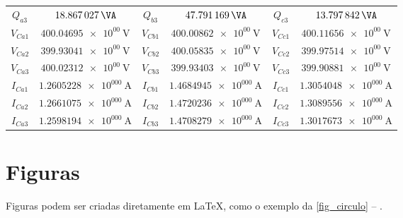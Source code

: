\begin{table}[!ht]
{\begin{tabular}{cc|cc|cc}
            $Q_{a3}$                             & $\SI{18.867027e+00}{\VA}$           & $Q_{b3}$  & $\SI{47.791169e+00}{\VA}$ & $Q_{c3}$  & $\SI{13.797842e+00}{\VA}$ \\
            $V_{Ca1}$                            & $\SI{400.04695e+00}{\V}$            & $V_{Cb1}$ & $\SI{400.00862e+00}{\V}$  & $V_{Cc1}$ & $\SI{400.11656e+00}{\V}$  \\
            $V_{Ca2}$                            & $\SI{399.93041e+00}{\V}$            & $V_{Cb2}$ & $\SI{400.05835e+00}{\V}$  & $V_{Cc2}$ & $\SI{399.97514e+00}{\V}$  \\
            $V_{Ca3}$                            & $\SI{400.02312e+00}{\V}$            & $V_{Cb3}$ & $\SI{399.93403e+00}{\V}$  & $V_{Cc3}$ & $\SI{399.90881e+00}{\V}$  \\
            $I_{Ca1}$                            & $\SI{1.2605228e+000}{\A}$           & $I_{Cb1}$ & $\SI{1.4684945e+000}{\A}$ & $I_{Cc1}$ & $\SI{1.3054048e+000}{\A}$ \\
            $I_{Ca2}$                            & $\SI{1.2661075e+000}{\A}$           & $I_{Cb2}$ & $\SI{1.4720236e+000}{\A}$ & $I_{Cc2}$ & $\SI{1.3089556e+000}{\A}$ \\
            $I_{Ca3}$                            & $\SI{1.2598194e+000}{\A}$           & $I_{Cb3}$ & $\SI{1.4708279e+000}{\A}$ & $I_{Cc3}$ & $\SI{1.3017673e+000}{\A}$ \\
            \bottomrule
        \end{tabular}}
\end{table}


\clearpage
\section{Figuras}

Figuras podem ser criadas diretamente em \LaTeX{},
como o exemplo da \autoref{fig_circulo} -- \showfont.

